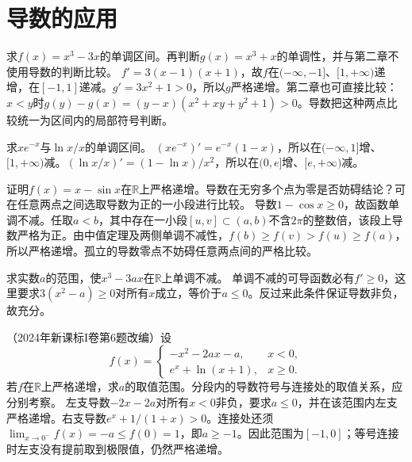 \par\addvspace{12pt}

\section{导数的应用}

求\(f(x)=x^3-3x\)的单调区间。再判断\(g(x)=x^3+x\)的单调性，并与第二章不使用导数的判断比较。
\solutionanswer
\(f'=3(x-1)(x+1)\)，故\(f\)在\(( -\infty,-1]\)、\([1,+\infty)\)递增，在\([-1,1]\)递减。\(g'=3x^2+1>0\)，所以\(g\)严格递增。第二章也可直接比较：\(x<y\)时\(g(y)-g(x)=(y-x)(x^2+xy+y^2+1)>0\)。导数把这种两点比较统一为区间内的局部符号判断。


求\(x e^{-x}\)与\(\ln x/x\)的单调区间。
\solutionanswer
\((xe^{-x})'=e^{-x}(1-x)\)，所以在\(( -\infty,1]\)增、\([1,+\infty)\)减。\((\ln x/x)'=(1-\ln x)/x^2\)，所以在\((0,e]\)增、\([e,+\infty)\)减。


证明\(f(x)=x-\sin x\)在\(\mathbb R\)上严格递增。导数在无穷多个点为零是否妨碍结论？可在任意两点之间选取导数为正的一小段进行比较。
\solutionanswer
导数\(1-\cos x\ge0\)，故函数单调不减。任取\(a<b\)，其中存在一小段\([u,v]\subset(a,b)\)不含\(2\pi\)的整数倍，该段上导数严格为正。由中值定理及两侧单调不减性，\(f(b)\ge f(v)>f(u)\ge f(a)\)，所以严格递增。孤立的导数零点不妨碍任意两点间的严格比较。


求实数\(a\)的范围，使\(x^3-3ax\)在\(\mathbb R\)上单调不减。
\solutionanswer
单调不减的可导函数必有\(f'\ge0\)，这里要求\(3(x^2-a)\ge0\)对所有\(x\)成立，等价于\(a\le0\)。反过来此条件保证导数非负，故充分。


（2024年新课标I卷第6题改编）设
\begin{equation*}
 f(x)=\begin{cases}-x^2-2ax-a,&x<0,\\ e^x+\ln(x+1),&x\ge0.\end{cases}
\end{equation*}
若\(f\)在\(\mathbb R\)上严格递增，求\(a\)的取值范围。分段内的导数符号与连接处的取值关系，应分别考察。
\solutionanswer
左支导数\(-2x-2a\)对所有\(x<0\)非负，要求\(a\le0\)，并在该范围内左支严格递增。右支导数\(e^x+1/(1+x)>0\)。连接处还须\(\lim_{x\to0^-}f(x)=-a\le f(0)=1\)，即\(a\ge-1\)。因此范围为\([-1,0]\)；等号连接时左支没有提前取到极限值，仍然严格递增。


